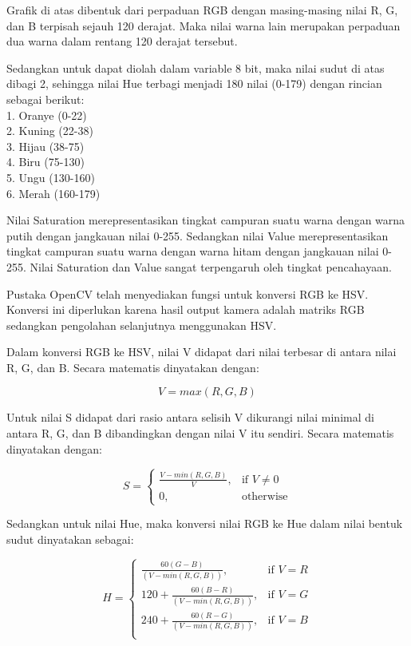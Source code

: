 \documentclass[a4paper,12pt]{article}
\begin{document}
Grafik di atas dibentuk dari perpaduan RGB dengan masing-masing nilai R, G, dan B terpisah sejauh 120 derajat.
Maka nilai warna lain merupakan perpaduan dua warna dalam rentang 120 derajat tersebut.

Sedangkan untuk dapat diolah dalam variable 8 bit, maka nilai sudut di atas dibagi 2, sehingga nilai Hue terbagi menjadi 180 nilai (0-179) dengan rincian sebagai berikut:\\
1. Oranye (0-22)\\
2. Kuning (22-38)\\
3. Hijau (38-75)\\
4. Biru (75-130)\\
5. Ungu (130-160)\\
6. Merah (160-179)

Nilai Saturation merepresentasikan tingkat campuran suatu warna dengan warna putih dengan jangkauan nilai 0-255.
Sedangkan nilai Value merepresentasikan tingkat campuran suatu warna dengan warna hitam dengan jangkauan nilai 0-255.
Nilai Saturation dan Value sangat terpengaruh oleh tingkat pencahayaan.

Pustaka OpenCV telah menyediakan fungsi untuk konversi RGB ke HSV.
Konversi ini diperlukan karena hasil output kamera adalah matriks RGB sedangkan pengolahan selanjutnya menggunakan HSV.

Dalam konversi RGB ke HSV, nilai V didapat dari nilai terbesar di antara nilai R, G, dan B. 
Secara matematis dinyatakan dengan:

\[
V = max(R,G,B)
\]

Untuk nilai S didapat dari rasio antara selisih V dikurangi nilai minimal di antara R, G, dan B dibandingkan dengan nilai V itu sendiri.
Secara matematis dinyatakan dengan:

\[
S =  
\begin{cases}
    \frac{V-min(R,G,B)}{V},& \text{if } V\neq 0\\
    0,              & \text{otherwise}
\end{cases}
\]

Sedangkan untuk nilai Hue, maka konversi nilai RGB ke Hue dalam nilai bentuk sudut dinyatakan sebagai:

\[
H =  
\begin{cases}
    \frac{60(G-B)}{(V-min(R,G,B))},& \text{if } V = R\\
    120 + \frac{60(B-R)}{(V-min(R,G,B))},& \text{if } V = G\\
    240 + \frac{60(R-G)}{(V-min(R,G,B))},& \text{if } V = B\\
\end{cases}
\]
\end{document}
